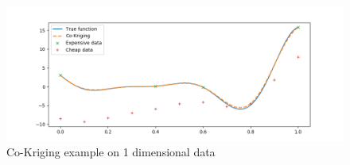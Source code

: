 \begin{figure}
    \centering
    \includegraphics[width=14cm]{figures/cokrig_1d.png}
    \caption{Co-Kriging example on 1 dimensional data}
    \label{fig:cokrig_1d}
\end{figure}


































